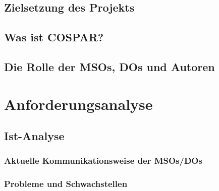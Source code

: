 \documentclass[11pt,a4paper]{article}
\begin{document}
\subsection{Zielsetzung des Projekts}

\subsection{Was ist COSPAR?}

\subsection{Die Rolle der MSOs, DOs und Autoren}

\newpage

\section{Anforderungsanalyse}

\subsection{Ist-Analyse}

\subsubsection{Aktuelle Kommunikationsweise der MSOs/DOs}

\subsubsection{Probleme und Schwachstellen}
\end{document}
